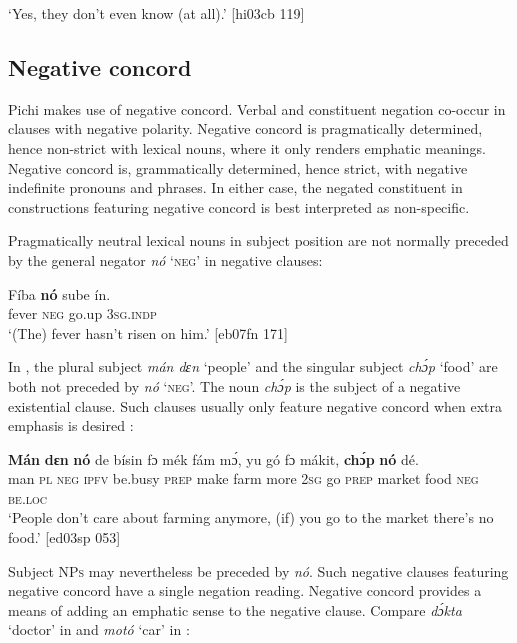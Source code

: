 \glt ‘Yes, they don’t even know (at all).’ [hi03cb 119]
\z

\subsection{Negative concord}\label{sec:7.2.2}

Pichi makes use of negative concord. Verbal and constituent negation co-occur in clauses with negative polarity. Negative concord is pragmatically determined, hence non-strict with lexical nouns, where it only renders emphatic meanings. Negative concord is, grammatically determined, hence strict, with negative indefinite pronouns and phrases. In either case, the negated constituent in constructions featuring negative concord is best interpreted as non-specific. 


Pragmatically neutral lexical nouns in subject position are not normally preceded by the general negator \textit{nó} ‘\textsc{neg}’ in negative clauses:


\ea%
    \label{ex:key:548}
    \gll Fíba    \textbf{nó}  sube    ín.\\
fever  \textsc{neg}  go.up  \textsc{3sg.indp}\\

\glt ‘(The) fever hasn’t risen on him.’ [eb07fn 171]
\z

In , the plural subject \textit{mán dɛn} ‘people’ and the singular subject \textit{chɔ́p} ‘food’ are both not preceded by \textit{nó} ‘\textsc{neg}’. The noun \textit{chɔ́p} is the subject of a negative existential clause. Such clauses usually only feature negative concord when extra emphasis is desired : 


\ea%
    \label{ex:key:549}
    \gll \textbf{Mán}    \textbf{dɛn}  \textbf{nó}  de  bísin  fɔ  mék    fám    mɔ́,
yu  gó  fɔ  mákit,  \textbf{chɔ́p}  \textbf{nó}  dé.\\
man    \textsc{pl}  \textsc{neg}  \textsc{ipfv}  be.busy  \textsc{prep}  make  farm  more
\textsc{2sg}  go  \textsc{prep}  market  food    \textsc{neg}  \textsc{be.loc}\\

\glt 
‘People don’t care about farming anymore, (if) you go to the market 
there’s no food.’ [ed03sp 053]
\z

Subject \textsc{NPs} may nevertheless be preceded by \textit{nó}. Such negative clauses featuring negative concord have a single negation reading. Negative concord provides a means of adding an emphatic sense to the negative clause. Compare \textit{dɔ́kta} ‘doctor’ in  and \textit{motó} ‘car’ in :


